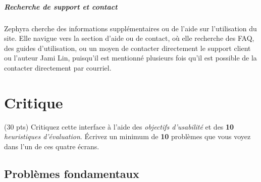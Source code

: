 \documentclass[9pt]{report}
\begin{document}
\begin{multicols*}{2}
  \paragraph{Recherche de support et contact}
  Zephyra cherche des informations supplémentaires ou de l'aide sur 
  l'utilisation du site. Elle navigue vers la section d'aide ou de 
  contact, où elle recherche des FAQ, des guides d'utilisation, ou 
  un moyen de contacter directement le support client ou l'auteur Jami Lin, 
  puisqu'il est mentionné plusieurs fois qu'il est possible de la 
  contacter directement par courriel. 

  \chapter{Critique}
  \begin{Exercice}{(30 pts)}{}
    Critiquez cette interface à l’aide des \textit{objectifs d’usabilité} et des 
  \textbf{10} \textit{heuristiques d’évaluation}. Écrivez un minimum 
  de \textbf{10} problèmes que vous voyez dans l’un de ces quatre écrans.     
  \end{Exercice}

  \section{Problèmes fondamentaux}


\end{multicols*}
\end{document}
